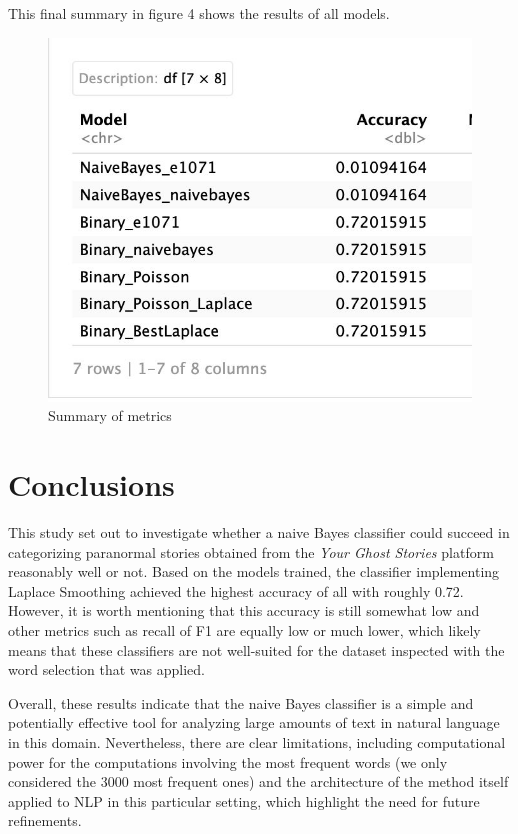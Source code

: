 \documentclass[twocolumn]{article}
\begin{document}
This final summary in figure 4 shows the results of all models.
\vspace{10cm}
\begin{figure}[htbp]
    \centering
    \includegraphics[width=0.9\columnwidth]{figures/summary_naive.jpeg}
    \caption{Summary of metrics}
    \label{summary}
\end{figure}

\section{Conclusions}
This study set out to investigate whether a naive Bayes classifier could  succeed in categorizing paranormal stories  obtained from the \textit{Your Ghost Stories} platform  reasonably well or not. 
Based on the models trained, the classifier implementing Laplace Smoothing achieved the highest accuracy of all with roughly 0.72. However, it is worth mentioning that this accuracy is still somewhat low and other metrics such as recall of F1 are equally low or much lower, which likely means that these classifiers are not well-suited for the dataset inspected with the word selection that was applied.

Overall, these results indicate that the naive Bayes classifier is a simple and potentially effective tool for analyzing large amounts of text in natural language in this domain. Nevertheless, there are clear limitations, including computational power for the computations involving the most frequent words (we only considered the 3000 most frequent ones) and the architecture of the method itself applied to NLP in this particular setting, which highlight the need for future refinements.
\end{document}
